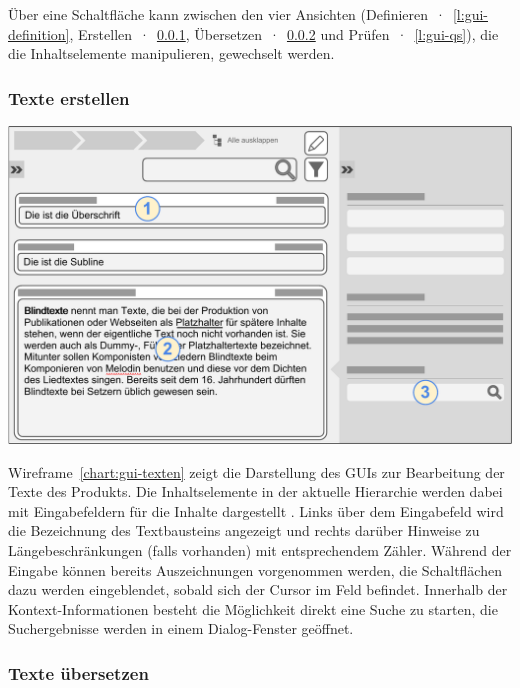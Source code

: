 Über eine Schaltfläche  kann zwischen den vier Ansichten (Definieren~·~\ref{l:gui-definition}, Erstellen~·~\ref{l:gui-texten}, Übersetzen~·~\ref{l:gui-uebersetzen} und Prüfen~·~\ref{l:gui-qs}), die die Inhaltselemente manipulieren, gewechselt werden.

\pagebreak

\subsubsection{Texte erstellen}\label{l:gui-texten}

\begin{center}
\includegraphics[width=\textwidth]{media/GUITexteerstellen.pdf}
\label{chart:gui-texten}
\end{center}

Wireframe~\ref{chart:gui-texten} zeigt die Darstellung des GUIs zur Bearbeitung der Texte des Produkts. Die Inhaltselemente in der aktuelle Hierarchie werden dabei mit Eingabefeldern für die Inhalte dargestellt . Links über dem Eingabefeld wird die Bezeichnung des Textbausteins angezeigt und rechts darüber Hinweise zu Längebeschränkungen (falls vorhanden) mit entsprechendem Zähler. Während der Eingabe können bereits Auszeichnungen vorgenommen werden, die Schaltflächen dazu werden eingeblendet, sobald sich der Cursor im Feld befindet. Innerhalb der Kontext-Informationen  besteht die Möglichkeit direkt eine Suche zu starten, die Suchergebnisse werden in einem Dialog-Fenster geöffnet.

\pagebreak

\subsubsection{Texte übersetzen}\label{l:gui-uebersetzen}

